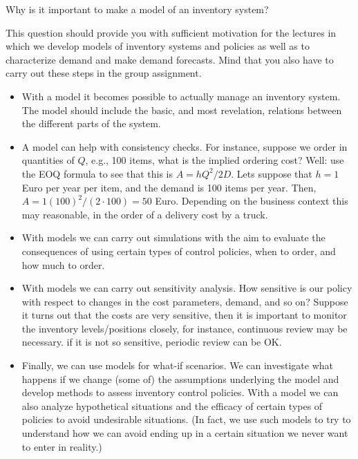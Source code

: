 \begin{question}
  Why is it important to make a model of an inventory system?

  This question should provide you with sufficient motivation for the
  lectures in which we develop models of inventory systems and policies as well as to characterize demand and make demand forecasts.  Mind that you also have to carry out these steps in the group
assignment.
\end{question}

  \begin{solution}
    \begin{itemize}
    \item With a model it becomes possible to actually manage an
      inventory system. The model should include the basic, and most
      revelation, relations between the different parts of the system.
    \item A model can help with consistency checks. For instance,
      suppose we order in quantities of $Q$, e.g., 100 items, what is
      the implied ordering cost?  Well: use the EOQ formula to see
      that this is $A=hQ^2/2D$.  Lets suppose that $h=1$ Euro per year
      per item, and the demand is 100 items per year. Then,
      $A=1(100)^2/(2\cdot 100) = 50$ Euro. Depending on the business
      context this may reasonable, in the order of a delivery cost by
      a truck.
    \item With models we can carry out simulations with the aim to
      evaluate the consequences of using certain types of control
      policies, when to order, and how much to order.
    \item With models we can carry out sensitivity analysis. How
      sensitive is our policy with respect to changes in the cost
      parameters, demand, and so on? Suppose it turns out that the
      costs are very sensitive, then it is important to monitor the
      inventory levels/positions closely, for instance, continuous
      review may be necessary. if it is not so sensitive, periodic
      review can be OK.
    \item Finally, we can use models for what-if scenarios.  We can
      investigate what happens if we change (some of) the assumptions
      underlying the model and develop methods to assess inventory
      control policies. With a model we can also analyze hypothetical
      situations and the efficacy of certain types of policies to
      avoid undesirable situations. (In fact, we use such models to
      try to understand how we can avoid ending up in a certain
      situation we never want to enter in reality.)
    \end{itemize}
  \end{solution}


